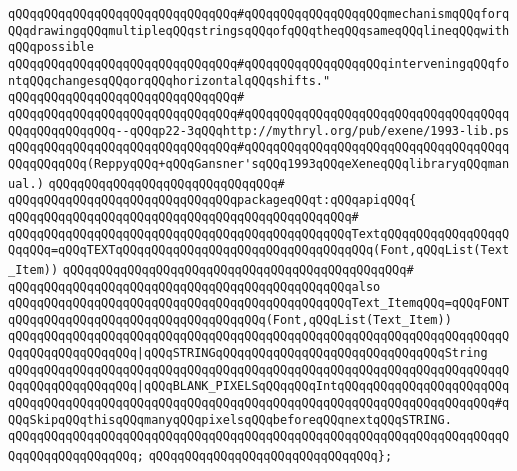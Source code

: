\verb|qQQqqQQqqQQqqQQqqQQqqQQqqQQqqQQq#qQQqqQQqqQQqqQQqqQQqmechanismqQQqforqQQqdrawingqQQqmultipleqQQqstringsqQQqofqQQqtheqQQqsameqQQqlineqQQqwithqQQqpossible|\newline
\verb|qQQqqQQqqQQqqQQqqQQqqQQqqQQqqQQq#qQQqqQQqqQQqqQQqqQQqinterveningqQQqfontqQQqchangesqQQqorqQQqhorizontalqQQqshifts."|\newline
\verb|qQQqqQQqqQQqqQQqqQQqqQQqqQQqqQQq#|\newline
\verb|qQQqqQQqqQQqqQQqqQQqqQQqqQQqqQQq#qQQqqQQqqQQqqQQqqQQqqQQqqQQqqQQqqQQqqQQqqQQqqQQqqQQq--qQQqp22-3qQQqhttp://mythryl.org/pub/exene/1993-lib.ps|\newline
\verb|qQQqqQQqqQQqqQQqqQQqqQQqqQQqqQQq#qQQqqQQqqQQqqQQqqQQqqQQqqQQqqQQqqQQqqQQqqQQqqQQq(ReppyqQQq+qQQqGansner'sqQQq1993qQQqeXeneqQQqlibraryqQQqmanual.)|\newline
\verb|qQQqqQQqqQQqqQQqqQQqqQQqqQQqqQQq#|\newline
\verb|qQQqqQQqqQQqqQQqqQQqqQQqqQQqqQQqpackageqQQqt:qQQqapiqQQq{|\newline
\verb|qQQqqQQqqQQqqQQqqQQqqQQqqQQqqQQqqQQqqQQqqQQqqQQq#|\newline
\verb|qQQqqQQqqQQqqQQqqQQqqQQqqQQqqQQqqQQqqQQqqQQqqQQqTextqQQqqQQqqQQqqQQqqQQqqQQq=qQQqTEXTqQQqqQQqqQQqqQQqqQQqqQQqqQQqqQQqqQQq(Font,qQQqList(Text_Item))|\newline
\verb|qQQqqQQqqQQqqQQqqQQqqQQqqQQqqQQqqQQqqQQqqQQqqQQq#|\newline
\verb|qQQqqQQqqQQqqQQqqQQqqQQqqQQqqQQqqQQqqQQqqQQqqQQqalso|\newline
\verb|qQQqqQQqqQQqqQQqqQQqqQQqqQQqqQQqqQQqqQQqqQQqqQQqText_ItemqQQq=qQQqFONTqQQqqQQqqQQqqQQqqQQqqQQqqQQqqQQqqQQq(Font,qQQqList(Text_Item))|\newline
\verb|qQQqqQQqqQQqqQQqqQQqqQQqqQQqqQQqqQQqqQQqqQQqqQQqqQQqqQQqqQQqqQQqqQQqqQQqqQQqqQQqqQQqqQQq|\verb#|qQQqSTRINGqQQqqQQqqQQqqQQqqQQqqQQqqQQqqQQqString#\newline
\verb|qQQqqQQqqQQqqQQqqQQqqQQqqQQqqQQqqQQqqQQqqQQqqQQqqQQqqQQqqQQqqQQqqQQqqQQqqQQqqQQqqQQqqQQq|\verb#|qQQqBLANK_PIXELSqQQqqQQqIntqQQqqQQqqQQqqQQqqQQqqQQqqQQqqQQqqQQqqQQqqQQqqQQqqQQqqQQqqQQqqQQqqQQqqQQqqQQqqQQqqQQqqQQqqQQq#\verb|#qQQqSkipqQQqthisqQQqmanyqQQqpixelsqQQqbeforeqQQqnextqQQqSTRING.|\newline
\verb|qQQqqQQqqQQqqQQqqQQqqQQqqQQqqQQqqQQqqQQqqQQqqQQqqQQqqQQqqQQqqQQqqQQqqQQqqQQqqQQqqQQqqQQq;|\newline
\verb|qQQqqQQqqQQqqQQqqQQqqQQqqQQqqQQq};|\newline
\newline
